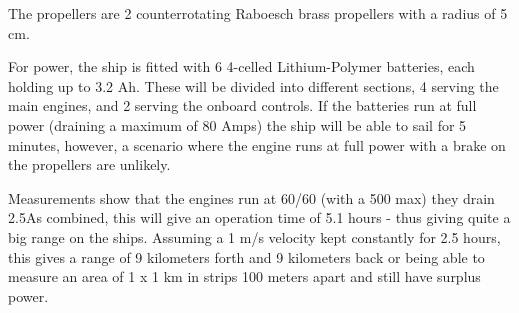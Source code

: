 The propellers are 2 counterrotating Raboesch brass propellers with a radius of 5 cm. 

For power, the ship is fitted with 6 4-celled Lithium-Polymer batteries, each holding up to 3.2 Ah. These will be divided into different sections, 4 serving the main engines, and 2 serving the onboard controls. If the batteries run at full power (draining a maximum of 80 Amps) the ship will be able to sail for 5 minutes, however, a scenario where the engine runs at full power with a brake on the propellers are unlikely.

Measurements show that the engines run at 60/60 (with a 500 max) they drain 2.5As combined, this will give an operation time of 5.1 hours - thus giving quite a big range on the ships. Assuming a 1 m/s velocity kept constantly for 2.5 hours, this gives a range of 9 kilometers forth and 9 kilometers back or being able to measure an area of 1 x 1 km in strips 100 meters apart and still have surplus power.